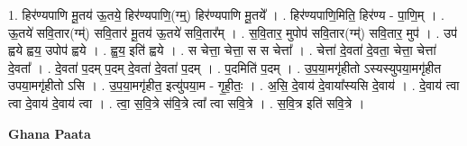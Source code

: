 \documentclass[17pt]{extarticle}
\begin{document}
1. हिर॑ण्यपाणि मू॒तय॑ ऊ॒तये॒ हिर॑ण्यपाणि॒(ग्म्॒) हिर॑ण्यपाणि मू॒तये᳚ । . हिर॑ण्यपाणि॒मिति॒ हिर॑ण्य - पा॒णि॒म् । . ऊ॒तये॑ सवि॒तार(ग्म्॑) सवि॒तार॑ मू॒तय॑ ऊ॒तये॑ सवि॒तार᳚म् । . स॒वि॒तार॒ मुपोप॑ सवि॒तार(ग्म्॑) सवि॒तार॒ मुप॑ । . उप॑ ह्वये ह्वय॒ उपोप॑ ह्वये । . ह्व॒य॒ इति॑ ह्वये । . स चेत्ता॒ चेत्ता॒ स स चेत्ता᳚ । . चेत्ता॑ दे॒वता॑ दे॒वता॒ चेत्ता॒ चेत्ता॑ दे॒वता᳚ । . दे॒वता॑ प॒दम् प॒दम् दे॒वता॑ दे॒वता॑ प॒दम् । . प॒दमिति॑ प॒दम् । . उ॒प॒या॒मगृ॑हीतो ऽस्यस्युपया॒मगृ॑हीत उपया॒मगृ॑हीतो ऽसि । . उ॒प॒या॒मगृ॑हीत॒ इत्यु॑पया॒म - गृ॒ही॒तः॒ । . अ॒सि॒ दे॒वाय॑ दे॒वाया᳚स्यसि दे॒वाय॑ । . दे॒वाय॑ त्वा त्वा दे॒वाय॑ दे॒वाय॑ त्वा । . त्वा॒ स॒वि॒त्रे स॑वि॒त्रे त्वा᳚ त्वा सवि॒त्रे । . स॒वि॒त्र इति॑ सवि॒त्रे । \newline

\textbf{Ghana Paata } \newline
\end{document}
